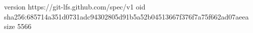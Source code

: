 version https://git-lfs.github.com/spec/v1
oid sha256:685714a351d0731adc94302805d91b5a52b04513667f376f7a75f662ad07aeea
size 5566
